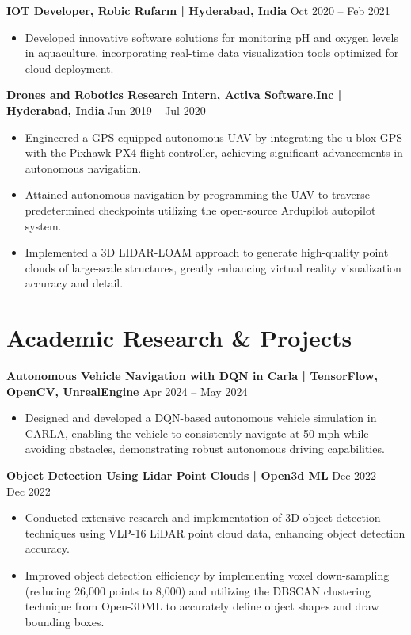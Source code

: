 \documentclass[a4paper,10pt]{article}
\begin{document}
\noindent\textbf{IOT Developer, Robic Rufarm | Hyderabad, India} \hfill Oct 2020 – Feb 2021
\begin{itemize}
    \item Developed innovative software solutions for monitoring pH and oxygen levels in aquaculture, incorporating real-time data visualization tools optimized for cloud deployment.
\end{itemize}

\noindent\textbf{Drones and Robotics Research Intern, Activa Software.Inc  | Hyderabad, India} \hfill Jun 2019 – Jul 2020
\begin{itemize}
    \item Engineered a GPS-equipped autonomous UAV by integrating the u-blox GPS with the Pixhawk PX4 flight controller, achieving significant advancements in autonomous navigation.
    \item Attained autonomous navigation by programming the UAV to traverse predetermined checkpoints utilizing the open-source Ardupilot autopilot system.
    \item Implemented a 3D LIDAR-LOAM approach to generate high-quality point clouds of large-scale structures, greatly enhancing virtual reality visualization accuracy and detail.
\end{itemize}

\section*{Academic Research \& Projects}
\noindent\textbf{Autonomous Vehicle Navigation with DQN in Carla | TensorFlow, OpenCV, UnrealEngine} \hfill Apr 2024 – May 2024
\begin{itemize}
    \item Designed and developed a DQN-based autonomous vehicle simulation in CARLA, enabling the vehicle to consistently navigate at 50 mph while avoiding obstacles, demonstrating robust autonomous driving capabilities.
\end{itemize}

\noindent\textbf{Object Detection Using Lidar Point Clouds | Open3d ML} \hfill Dec 2022 – Dec 2022
\begin{itemize}
    \item Conducted extensive research and implementation of 3D-object detection techniques using VLP-16 LiDAR point cloud data, enhancing object detection accuracy.
    \item Improved object detection efficiency by implementing voxel down-sampling (reducing 26,000 points to 8,000) and utilizing the DBSCAN clustering technique from Open-3DML to accurately define object shapes and draw bounding boxes.
\end{itemize}
\end{document}
